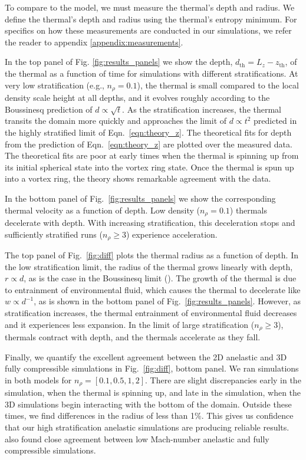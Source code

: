 \documentclass[twocolumn, amsmath, amsfonts, amssymb, trackchanges]{aastex62}
\newcommand{\LJ}{\citetalias{lecoanet&jeevanjee2018}}
\begin{document}
To compare to the model, we must measure the thermal's depth and radius.
We define the thermal's depth and radius using the thermal's entropy minimum.
For specifics on how these measurements are conducted in our simulations, we refer the reader to appendix \ref{appendix:measurements}.

In the top panel of Fig. \ref{fig:results_panels} we show the depth, $d_{\text{th}} = L_z - z_{\text{th}}$, of the thermal as a function of time for simulations with different stratifications. 
At very low stratification (e.g., $n_\rho = 0.1$), the thermal is small compared to the local density scale height at all depths, and it evolves roughly according to the Boussinesq prediction of $d \propto \sqrt{t}$. 
As the stratification increases, the thermal transits the domain more quickly and approaches the limit of $d \propto t^2$ predicted in the highly stratified limit of Eqn.~\ref{eqn:theory_z}. 
The theoretical fits for depth from the prediction of Eqn.~\ref{eqn:theory_z} are plotted over the measured data.
The theoretical fits are poor at early times when the thermal is spinning up from its initial spherical state into the vortex ring state.
Once the thermal is spun up into a vortex ring, the theory shows remarkable agreement with the data.

In the bottom panel of Fig.~\ref{fig:results_panels} we show the corresponding thermal velocity as a function of depth.
Low density ($n_\rho = 0.1$) thermals decelerate with depth.
With increasing stratification, this deceleration stops and sufficiently stratified runs ($n_\rho \geq 3$) experience acceleration.

The top panel of Fig.~\ref{fig:diff} plots the thermal radius as a function of depth.
In the low stratification limit, the radius of the thermal grows linearly with depth, $r \propto d$, as is the case in the Boussinesq limit (\LJ).
The growth of the thermal is due to entrainment of environmental fluid, which causes the thermal to decelerate like $w \propto d^{-1}$, as is shown in the bottom panel of Fig.~\ref{fig:results_panels}.
However, as stratification increases, the thermal entrainment of environmental fluid decreases and it experiences less expansion.
In the limit of large stratification ($n_\rho \geq 3$), thermals contract with depth, and the thermals accelerate as they fall.

Finally, we quantify the excellent agreement between the 2D anelastic and 3D fully compressible simulations in Fig.~\ref{fig:diff}, bottom panel.
We ran simulations in both models for $n_\rho = [0.1, 0.5, 1, 2]$.
There are slight discrepancies early in the simulation, when the thermal is spinning up, and late in the simulation, when the 3D simulations begin interacting with the bottom of the domain.
Outside these times, we find differences in the radius of less than 1\%.
This gives us confidence that our high stratification anelastic simulations are producing reliable results.
\citet{lecoanet&all2014} also found close agreement between low Mach-number anelastic and fully compressible simulations.
\end{document}
